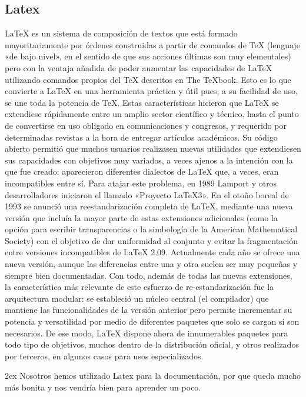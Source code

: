 \documentclass[12pt,a4paper]{report}
\begin{document}
\subsection{Latex} 
LaTeX es un sistema de composición de textos que está formado mayoritariamente 
por órdenes construidas a partir de comandos de TeX (lenguaje «de bajo nivel»,
en el sentido de que sus acciones últimas son muy elementales) pero con la 
ventaja añadida de poder aumentar las capacidades de LaTeX utilizando comandos 
propios del TeX descritos en The TeXbook. Esto es lo que convierte a LaTeX en 
una herramienta práctica y útil pues, a su facilidad de uso, se une toda la 
potencia de TeX. Estas características hicieron que LaTeX se extendiese 
rápidamente entre un amplio sector científico y técnico, hasta el punto de 
convertirse en uso obligado en comunicaciones y congresos, y requerido por 
determinadas revistas a la hora de entregar artículos académicos.
Su código abierto permitió que muchos usuarios realizasen nuevas utilidades que
extendiesen sus capacidades con objetivos muy variados, a veces ajenos a la
intención con la que fue creado: aparecieron diferentes dialectos de LaTeX que,
a veces, eran incompatibles entre sí. Para atajar este problema, en 1989 Lamport
y otros desarrolladores iniciaron el llamado «Proyecto LaTeX3». En el otoño
boreal de 1993 se anunció una reestandarización completa de LaTeX, mediante una
nueva versión que incluía la mayor parte de estas extensiones adicionales (como
la opción para escribir transparencias o la simbología de la American
Mathematical Society) con el objetivo de dar uniformidad al conjunto y evitar la
fragmentación entre versiones incompatibles de LaTeX 2.09. Actualmente cada año 
se ofrece una nueva versión, aunque las diferencias entre una y otra suelen ser 
muy pequeñas y siempre bien documentadas.
Con todo, además de todas las nuevas extensiones, la característica más
relevante de este esfuerzo de re-estandarización fue la arquitectura modular: se
estableció un núcleo central (el compilador) que mantiene las funcionalidades de
la versión anterior pero permite incrementar su potencia y versatilidad por
medio de diferentes paquetes que solo se cargan si son necesarios. De ese modo,
LaTeX dispone ahora de innumerables paquetes para todo tipo de objetivos, muchos
dentro de la distribución oficial, y otros realizados por terceros, en algunos
casos para usos especializados.

\parskip 2ex
Nosotros hemos utilizado Latex para la documentación, por que queda mucho más
bonita y nos vendría bien para aprender un poco. 
\end{document}

